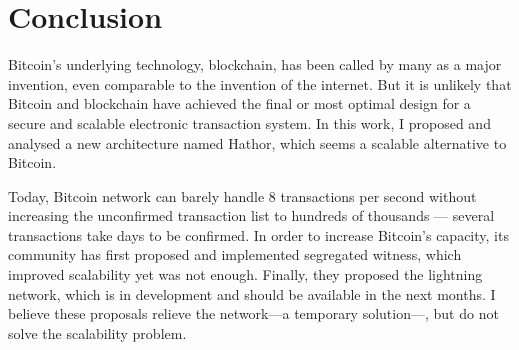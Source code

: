 



\chapter{Conclusion}

Bitcoin's underlying technology, blockchain, has been called by many as a major invention, even comparable to the invention of the internet. But it is unlikely that Bitcoin and blockchain have achieved the final or most optimal design for a secure and scalable electronic transaction system. In this work, I proposed and analysed a new architecture named Hathor, which seems a scalable alternative to Bitcoin.

Today, Bitcoin network can barely handle 8 transactions per second without increasing the unconfirmed transaction list to hundreds of thousands --- several transactions take days to be confirmed. In order to increase Bitcoin's capacity, its community has first proposed and implemented segregated witness, which improved scalability yet was not enough. Finally, they proposed the lightning network, which is in development and should be available in the next months. I believe these proposals relieve the network---a temporary solution---, but do not solve the scalability problem.

